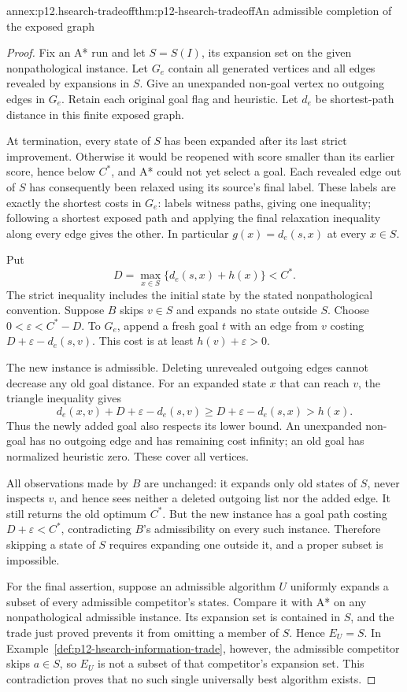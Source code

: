 \begin{annexitem}{annex:p12.hsearch-tradeoff}{thm:p12-hsearch-tradeoff}{An admissible completion of the exposed graph}
\begin{proof}
Fix an A* run and let \(S=S(I)\), its expansion set on the given
nonpathological instance. Let \(G_e\) contain all generated vertices
and all edges revealed by expansions in \(S\). Give an unexpanded
non-goal vertex no outgoing edges in \(G_e\). Retain each original
goal flag and heuristic. Let \(d_e\) be shortest-path distance in
this finite exposed graph.

At termination, every state of \(S\) has been expanded after its last
strict improvement. Otherwise it would be reopened with score smaller
than its earlier score, hence below \(C^*\), and A* could not yet
select a goal. Each revealed edge out of \(S\) has consequently been
relaxed using its source's final label. These labels are exactly the
shortest costs in \(G_e\): labels witness paths, giving one inequality;
following a shortest exposed path and applying the final relaxation
inequality along every edge gives the other. In particular
\(g(x)=d_e(s,x)\) at every \(x\in S\).

Put
\[
 D=\max_{x\in S}\{d_e(s,x)+h(x)\}<C^*.
\]
The strict inequality includes the initial state by the stated
nonpathological convention. Suppose \(B\) skips \(v\in S\) and
expands no state outside \(S\). Choose \(0<\varepsilon<C^*-D\).
To \(G_e\), append a fresh goal \(t\) with an edge from \(v\)
costing \(D+\varepsilon-d_e(s,v)\). This cost is at least
\(h(v)+\varepsilon>0\).

The new instance is admissible. Deleting unrevealed outgoing edges
cannot decrease any old goal distance. For an expanded state \(x\)
that can reach \(v\), the triangle inequality gives
\[
 d_e(x,v)+D+\varepsilon-d_e(s,v)
 \ge D+\varepsilon-d_e(s,x)>h(x).
\]
Thus the newly added goal also respects its lower bound. An unexpanded
non-goal has no outgoing edge and has remaining cost infinity; an old
goal has normalized heuristic zero. These cover all vertices.

All observations made by \(B\) are unchanged: it expands only old
states of \(S\), never inspects \(v\), and hence sees neither a
deleted outgoing list nor the added edge. It still returns the old
optimum \(C^*\). But the new instance has a goal path costing
\(D+\varepsilon<C^*\), contradicting \(B\)'s admissibility on
every such instance. Therefore skipping a state of \(S\) requires
expanding one outside it, and a proper subset is impossible.

For the final assertion, suppose an admissible algorithm \(U\)
uniformly expands a subset of every admissible competitor's states.
Compare it with A* on any nonpathological admissible instance. Its
expansion set is contained in \(S\), and the trade just proved
prevents it from omitting a member of \(S\). Hence \(E_U=S\).
In Example~\ref{def:p12-hsearch-information-trade}, however, the
admissible competitor skips \(a\in S\), so \(E_U\) is not a
subset of that competitor's expansion set. This contradiction proves
that no such single universally best algorithm exists.
\end{proof}
\end{annexitem}


